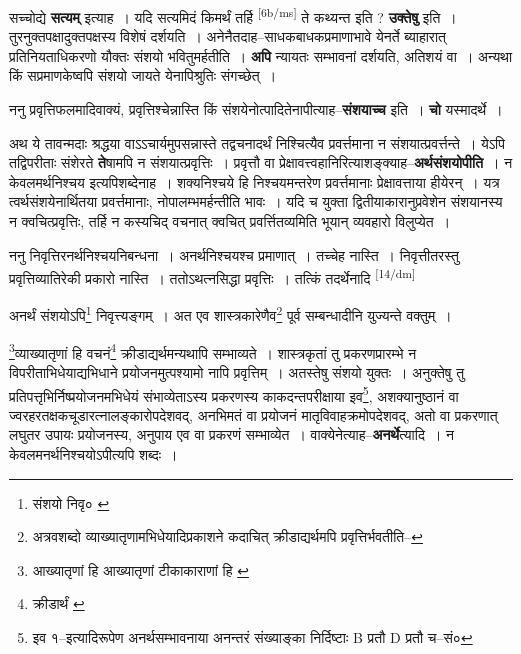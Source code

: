 \documentclass[article,12pt,a4paper]{memoir}
\begin{document}
	  \pstart सच्चोद्ये \textbf{सत्यम्} इत्याह । यदि सत्यमिदं किमर्थं तर्हि \leavevmode\textsuperscript{\rmlatinfont\tiny [6b/ms]} ते कथ्यन्त इति ? \textbf{उक्तेषु} इति । तुरनुक्तपक्षादुक्तपक्षस्य विशेषं दर्शयति । अनेनैतदाह--साधकबाधकप्रमाणाभावे येनर्ते ब्याहारात् प्रतिनियताधिकरणो यौक्तः संशयो भवितुमर्हतीति । \textbf{अपि} न्यायतः सम्भावनां दर्शयति, अतिशयं वा । अन्यथा किं सप्रमाणकेष्वपि संशयो जायते येनापिश्रुतिः संगच्छेत् ।
	\pend
      

	  \pstart ननु प्रवृत्तिफलमादिवाक्यं, प्रवृत्तिश्चेन्नास्ति किं संशयेनोत्पादितेनापीत्याह--\textbf{संशयाच्च} इति । \textbf{चो} यस्मादर्थे ।
	\pend
      

	  \pstart अथ ये तावन्मदाः श्रद्धया वाऽऽचार्यमुपसन्नास्ते तद्वचनादर्थं निश्चित्यैव प्रवर्त्तमाना न संशयात्प्रवर्त्तन्ते । येऽपि तद्विपरीताः संशेरते \textbf{ते}षामपि न संशयात्प्रवृत्तिः । प्रवृत्तौ वा प्रेक्षावत्त्वहानिरित्याशङ्क्याह--\textbf{अर्थसंशयोपीति} । न केवलमर्थनिश्चय इत्यपिशब्देनाह । शक्यनिश्चये हि निश्चयमन्तरेण प्रवर्त्तमानाः प्रेक्षावत्ताया हीयेरन् । यत्र त्वर्थसंशयेनार्थितया प्रवर्त्तमानाः, नोपालम्भमर्हन्तीति भावः । यदि च युक्ता द्वितीयाकारानुप्रवेशेन संशयानस्य न क्वचित्प्रवृत्तिः, तर्हि न कस्यचिद् वचनात् क्वचित् प्रवर्त्तितव्यमिति भूयान् व्यवहारो विलुप्येत ।
	\pend
      

	  \pstart ननु निवृत्तिरनर्थनिश्चयनिबन्धना । अनर्थनिश्चयश्च प्रमाणात् । तच्चेह नास्ति । निवृत्तीतरस्तु प्रवृत्तिव्यातिरेकी प्रकारो नास्ति । ततोऽथत्नसिद्धा प्रवृत्तिः । तत्किं तदर्थेनादि \leavevmode\textsuperscript{\rmlatinfont\tiny [14/dm]} 
	  
	अनर्थं संशयोऽपि\footnote{संशयो निवृ० \cite{dp-msA} \cite{dp-edP} \cite{dp-edH} \cite{dp-edE} \cite{dp-edN}} निवृत्त्यङ्गम् । अत एव शास्त्रकारेणैव\footnote{अत्रवशब्दो व्याख्यातृणामभिधेयादिप्रकाशने कदाचित् क्रीडाद्यर्थमपि प्रवृत्तिर्भवतीति--\cite{dp-msD-n}} पूर्व सम्बन्धादीनि युज्यन्ते वक्तुम् । 
	  
	\footnote{आख्यातृणां हि \cite{dp-edE} \cite{dp-edN} आख्यातृणां टीकाकाराणां हि \cite{dp-msB}}व्याख्यातृणां हि वचनं\footnote{क्रीडार्थं \cite{dp-msA} \cite{dp-edP} \cite{dp-edE}} क्रीडाद्यर्थमन्यथापि सम्भाव्यते । शास्त्रकृतां तु प्रकरणप्रारम्भे न विपरीताभिधेयाद्यभिधाने प्रयोजनमुत्पश्यामो नापि प्रवृत्तिम् । अतस्तेषु संशयो युक्तः । अनुक्तेषु तु प्रतिपत्तृभिर्निष्प्रयोजनमभिधेयं संभाव्येताऽस्य प्रकरणस्य काकदन्तपरीक्षाया इव\footnote{इव १--इत्यादिरूपेण अनर्थसम्भावनाया अनन्तरं संख्याङ्का निर्दिष्टाः B प्रतौ D प्रतौ च--सं०}, अशक्यानुष्ठानं वा ज्वरहरतक्षकचूडारत्नालङ्कारोपदेशवद्, अनभिमतं वा प्रयोजनं मातृविवाहक्रमोपदेशवद्, अतो वा प्रकरणात् लघुतर उपायः प्रयोजनस्य, अनुपाय एव वा प्रकरणं सम्भाव्येत । वाक्येनेत्याह--\textbf{अनर्थे}त्यादि । न केवलमनर्थनिश्चयोऽपीत्यपि शब्दः ।
	\pend
      
\end{document}
